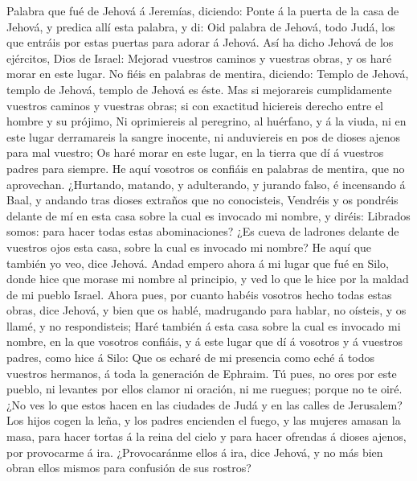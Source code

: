  Palabra que fué de Jehová á Jeremías, diciendo:
 Ponte á la puerta de la casa de Jehová, y predica allí esta
palabra, y di: Oid palabra de Jehová, todo Judá, los que entráis por
estas puertas para adorar á Jehová.  Así ha dicho Jehová de
los ejércitos, Dios de Israel: Mejorad vuestros caminos y vuestras
obras, y os haré morar en este lugar.  No fiéis en palabras
de mentira, diciendo: Templo de Jehová, templo de Jehová, templo de
Jehová es éste.  Mas si mejorareis cumplidamente vuestros
caminos y vuestras obras; si con exactitud hiciereis derecho entre el
hombre y su prójimo,  Ni oprimiereis al peregrino, al
huérfano, y á la viuda, ni en este lugar derramareis la sangre inocente,
ni anduviereis en pos de dioses ajenos para mal vuestro;  Os
haré morar en este lugar, en la tierra que dí á vuestros padres para
siempre.  He aquí vosotros os confiáis en palabras de
mentira, que no aprovechan.  ¿Hurtando, matando, y
adulterando, y jurando falso, é incensando á Baal, y andando tras dioses
extraños que no conocisteis,  Vendréis y os pondréis
delante de mí en esta casa sobre la cual es invocado mi nombre, y
diréis: Librados somos: para hacer todas estas abominaciones?
 ¿Es cueva de ladrones delante de vuestros ojos esta casa,
sobre la cual es invocado mi nombre? He aquí que también yo veo, dice
Jehová.  Andad empero ahora á mi lugar que fué en Silo,
donde hice que morase mi nombre al principio, y ved lo que le hice por
la maldad de mi pueblo Israel.  Ahora pues, por cuanto
habéis vosotros hecho todas estas obras, dice Jehová, y bien que os
hablé, madrugando para hablar, no oísteis, y os llamé, y no
respondisteis;  Haré también á esta casa sobre la cual es
invocado mi nombre, en la que vosotros confiáis, y á este lugar que dí á
vosotros y á vuestros padres, como hice á Silo:  Que os
echaré de mi presencia como eché á todos vuestros hermanos, á toda la
generación de Ephraim.  Tú pues, no ores por este pueblo,
ni levantes por ellos clamor ni oración, ni me ruegues; porque no te
oiré.  ¿No ves lo que estos hacen en las ciudades de Judá y
en las calles de Jerusalem?  Los hijos cogen la leña, y los
padres encienden el fuego, y las mujeres amasan la masa, para hacer
tortas á la reina del cielo y para hacer ofrendas á dioses ajenos, por
provocarme á ira.  ¿Provocaránme ellos á ira, dice Jehová,
y no más bien obran ellos mismos para confusión de sus rostros?
